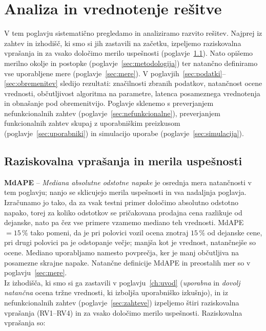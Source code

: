 %

\newcommand{\res}[1]{\textcolor{red}{\textbf{[#1]}}}

\chapter{Analiza in vrednotenje rešitve}
\label{ch:analiza}

V tem poglavju sistematično pregledamo in analiziramo razvito rešitev. Najprej iz zahtev in
izhodišč, ki smo si jih zastavili na začetku, izpeljemo raziskovalna vprašanja in za vsako določimo merilo
uspešnosti (poglavje~\ref{sec:rq}). Nato opišemo merilno okolje in postopke
(poglavje~\ref{sec:metodologija}) ter natančno definiramo vse uporabljene mere
(poglavje~\ref{sec:mere}). V poglavjih~\ref{sec:podatki}--\ref{sec:obremenitev}
sledijo rezultati: značilnosti zbranih podatkov, natančnost ocene vrednosti,
občutljivost algoritma na parametre, latenca posameznega vrednotenja in obnašanje
pod obremenitvijo. Poglavje sklenemo s preverjanjem nefunkcionalnih zahtev
(poglavje~\ref{sec:nefunkcionalne}), preverjanjem funkcionalnih zahtev skupaj z
uporabniškim preizkusom (poglavje~\ref{sec:uporabniki}) in simulacijo uporabe
(poglavje~\ref{sec:simulacija}).

\section{Raziskovalna vprašanja in merila uspešnosti}
\label{sec:rq}
\textbf{MdAPE} -- \emph{Mediana absolutne odstotne napake} je osrednja mera natančnosti v
tem poglavju; nanjo se sklicujejo merila uspešnosti in vsa nadaljnja poglavja.
Izračunamo jo tako, da za vsak testni primer določimo absolutno odstotno napako,
torej za koliko odstotkov se pričakovana prodajna cena razlikuje od dejanske, nato pa čez
vse primere vzamemo mediano teh vrednosti. MdAPE $=15\,\%$ tako pomeni, da je pri
polovici vozil ocena znotraj $15\,\%$ od dejanske cene, pri drugi polovici pa je
odstopanje večje; manjša kot je vrednost, natančnejše so ocene. Mediano
uporabljamo namesto povprečja, ker je manj občutljiva na posamezne skrajne
napake. Natančne definicije MdAPE in preostalih mer so v
poglavju~\ref{sec:mere}.\\
Iz izhodišča, ki smo si ga zastavili v poglavju~\ref{ch:uvod} (\emph{uporabna} in
\emph{dovolj natančna} ocena tržne vrednosti, ki izboljša uporabniško izkušnjo), in
iz nefunkcionalnih zahtev (poglavje~\ref{sec:zahteve}) izpeljemo
štiri raziskovalna vprašanja (RV1--RV4) in za vsako določimo merilo uspešnosti.
Raziskovalna vprašanja so:

